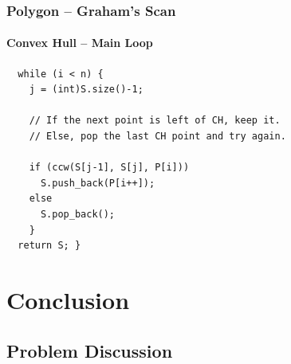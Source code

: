 \documentclass{beamer}
\begin{document}
\begin{frame}[fragile]
  \frametitle{Polygon -- Graham's Scan}
  \framesubtitle{Convex Hull -- Main Loop}

  {\small
    \begin{exampleblock}{}
\begin{verbatim}
  while (i < n) {
    j = (int)S.size()-1;

    // If the next point is left of CH, keep it.
    // Else, pop the last CH point and try again.

    if (ccw(S[j-1], S[j], P[i]))
      S.push_back(P[i++]);
    else
      S.pop_back();
    }
  return S; }
\end{verbatim}
\end{exampleblock}}
\end{frame}


\section{Conclusion}

\subsection{Problem Discussion}

\end{document}

